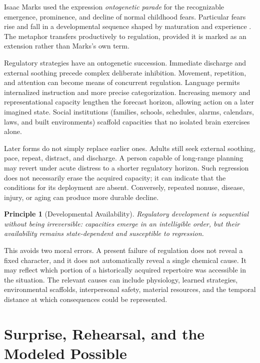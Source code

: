 \documentclass[11pt]{article}
\newtheorem*{principle}{Principle}
\begin{document}
Isaac Marks used the expression \emph{ontogenetic parade} for the recognizable emergence, prominence, and decline of normal childhood fears. Particular fears rise and fall in a developmental sequence shaped by maturation and experience 
\citep{marks1987fear,marks1987book}. The metaphor transfers productively to regulation, provided it is marked as an extension rather than Marks's own term.

Regulatory strategies have an ontogenetic succession. Immediate discharge and external soothing precede complex deliberate inhibition. Movement, repetition, and attention can become means of concurrent regulation. Language permits internalized instruction and more precise categorization. Increasing memory and representational capacity lengthen the forecast horizon, allowing action on a later imagined state. Social institutions (families, schools, schedules, alarms, calendars, laws, and built environments) scaffold capacities that no isolated brain exercises alone.

Later forms do not simply replace earlier ones. Adults still seek external soothing, pace, repeat, distract, and discharge. A person capable of long-range planning may revert under acute distress to a shorter regulatory horizon. Such regression does not necessarily erase the acquired capacity; it can indicate that the conditions for its deployment are absent. Conversely, repeated nonuse, disease, injury, or aging can produce more durable decline.

\begin{principle}[Developmental Availability]
Regulatory development is sequential without being irreversible: capacities emerge in an intelligible order, but their availability remains state-dependent and susceptible to regression.
\end{principle}

This avoids two moral errors. A present failure of regulation does not reveal a fixed character, and it does not automatically reveal a single chemical cause. It may reflect which portion of a historically acquired repertoire was accessible in the situation. The relevant causes can include physiology, learned strategies, environmental scaffolds, interpersonal safety, material resources, and the temporal distance at which consequences could be represented.

\section{Surprise, Rehearsal, and the Modeled Possible}
\end{document}
